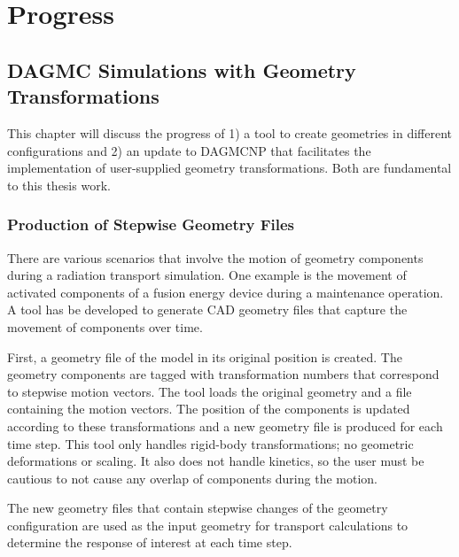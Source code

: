 \chapter{Progress} \label{ch:progress}

\section{DAGMC Simulations with Geometry Transformations}\label{sec:dagmc_trans}
This chapter will discuss the progress of 1) a tool to create geometries in
different configurations and 2) an update to DAGMCNP that facilitates the
implementation of user-supplied geometry transformations. Both are fundamental to 
this thesis work.

\subsection{Production of Stepwise Geometry Files}\label{sec:timestep_geoms}
There are various scenarios that involve the motion of geometry components 
during a radiation transport simulation.  One example is the movement of
activated components of a fusion energy device during a maintenance operation.
A tool has be developed to generate CAD geometry files that capture the 
movement of components over time.  

First, a geometry file of the model in its 
original position is created. The geometry components are tagged with 
transformation numbers that correspond to stepwise motion vectors.
The tool loads the original geometry and a file containing the motion vectors.
The position of the components 
is updated according to these transformations and a new geometry file is 
produced for each time step.  This tool only handles rigid-body
transformations; no geometric deformations or scaling.  It also does not handle kinetics, 
so the user must be cautious to not cause any overlap of components during the
motion.  

The new geometry files that contain stepwise changes of the geometry 
configuration are used as the input geometry for
transport calculations to determine the response of interest at each time step.

